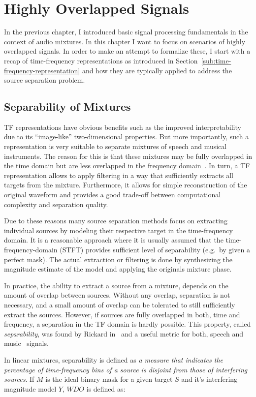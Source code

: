 \hypertarget{highly-overlapped-signals}{%
\chapter{Highly Overlapped Signals}\label{highly-overlapped-signals}}

In the previous chapter, I introduced basic signal processing fundamentals in the context of audio mixtures.
In this chapter I want to focus on scenarios of highly overlapped signals.
In order to make an attempt to formalize these, I start with a recap of time-frequency representations as introduced in Section~\ref{sub:time-frequency-representation} and how they are typically applied to address the source separation problem.

\hypertarget{separability-of-mixtures}{%
\section{Separability of Mixtures}\label{separability-of-mixtures}}

TF representations have obvious benefits such as the improved interpretability due to its ``image-like'' two-dimensional properties.
But more importantly, such a representation is very suitable to separate mixtures of speech and musical instruments.
The reason for this is that these mixtures may be fully overlapped in the time domain but are less overlapped in the frequency domain~\cite{rickard02, giannoulis11, rafii}.
In turn, a TF representation allows to apply filtering in a way that sufficiently extracts all targets from the mixture.
Furthermore, it allows for simple reconstruction of the original waveform and provides a good trade-off between computational complexity and separation quality.
\par
Due to these reasons many source separation methods focus on extracting individual sources by modeling their respective target in the time-frequency domain.
It is a reasonable approach where it is usually assumed that the time-frequency-domain (STFT) provides sufficient level of separability (e.g.~by given a perfect mask).
The actual extraction or filtering is done by synthesizing the magnitude estimate of the model and applying the originals mixture phase.
\par
In practice, the ability to extract a source from a mixture, depends on the amount of overlap between sources.
Without any overlap, separation is not necessary, and a small amount of overlap can be tolerated to still sufficiently extract the sources.
However, if sources are fully overlapped in both, time and frequency, a separation in the TF domain is hardly possible.
This property, called \emph{separability}, was found by Rickard in~\cite{rickard02} and a useful metric for both, speech and music~\cite{giannoulis11} signals.
\par
In linear mixtures, separability is defined as \emph{a measure that indicates the percentage of time-frequency bins of a source is disjoint from those of interfering sources}.
If \(M\) is the ideal binary mask for a given target \(S\) and it's interfering
magnitude model \(Y\), \(WDO\) is defined as:

